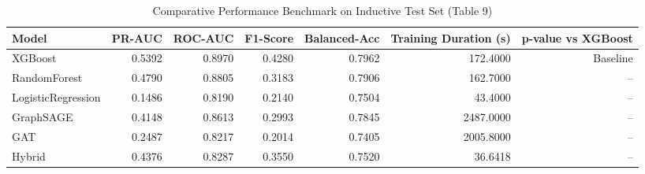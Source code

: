 \begin{table}
\caption{Comparative Performance Benchmark on Inductive Test Set (Table 9)}
\label{tab:overall_metrics}
\begin{tabular}{lrrrrrr}
\toprule
Model & PR-AUC & ROC-AUC & F1-Score & Balanced-Acc & Training Duration (s) & p-value vs XGBoost \\
\midrule
XGBoost & 0.5392 & 0.8970 & 0.4280 & 0.7962 & 172.4000 & Baseline \\
RandomForest & 0.4790 & 0.8805 & 0.3183 & 0.7906 & 162.7000 & -- \\
LogisticRegression & 0.1486 & 0.8190 & 0.2140 & 0.7504 & 43.4000 & -- \\
GraphSAGE & 0.4148 & 0.8613 & 0.2993 & 0.7845 & 2487.0000 & -- \\
GAT & 0.2487 & 0.8217 & 0.2014 & 0.7405 & 2005.8000 & -- \\
Hybrid & 0.4376 & 0.8287 & 0.3550 & 0.7520 & 36.6418 & -- \\
\bottomrule
\end{tabular}
\end{table}
